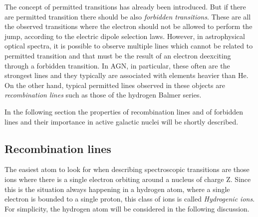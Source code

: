 \documentclass[../main.tex]{subfiles}
\begin{document}
The concept of permitted transitions has already been introduced.
But if there are permitted transition there should be also \emph{forbidden transitions}.
These are all the observed transitions where the electron should not be allowed to perform the jump, according to the electric dipole selection laws.
However, in astrophysical optical spectra, it is possible to observe multiple lines which cannot be related to permitted transition and that must be the result of an electron deexciting through a forbidden transition.
In AGN, in particular, these often are the strongest lines and they typically are associated with elements heavier than He.
On the other hand, typical permitted lines observed in these objects are \emph{recombination lines} such as those of the hydrogen Balmer series.

In the following section the properties of recombination lines and of forbidden lines and their importance in active galactic nuclei will be shortly described.

\subsection{Recombination lines}

The easiest atom to look for when describing spectroscopic transitions are those ions where 
there is a single electron orbiting around a nucleus of charge Z.
Since this is the situation always happening in a hydrogen atom, where a single electron is bounded to a single proton, this class of ions is called \emph{Hydrogenic ions}.
For simplicity, the hydrogen atom will be considered in the following discussion.
\end{document}
